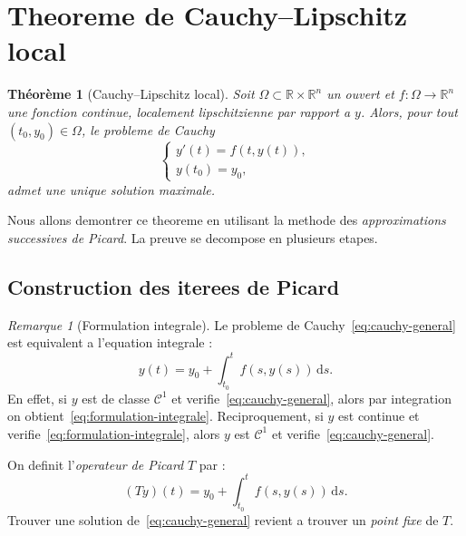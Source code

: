 \documentclass[12pt,a4paper,openany]{book}
\theoremstyle{definition}
\theoremstyle{plain}
\newtheorem{theoreme}[definition]{Théorème}
\theoremstyle{remark}
\newtheorem{remarque}[definition]{Remarque}
\newcommand{\R}{\mathbb{R}}
\newcommand{\dd}{\mathrm{d}}
\begin{document}
\section{Theoreme de Cauchy--Lipschitz local}\label{sec:cauchy-lipschitz}

\begin{theoreme}[Cauchy--Lipschitz local]\label{thm:cauchy-lipschitz}
Soit $\Omega \subset \R \times \R^n$ un ouvert et $f : \Omega \to \R^n$ une fonction continue, localement lipschitzienne par rapport a $y$. Alors, pour tout $(t_0, y_0) \in \Omega$, le probleme de Cauchy
\[
\begin{cases}
y'(t) = f(t, y(t)), \\
y(t_0) = y_0,
\end{cases}
\]
admet une \emph{unique} solution maximale.
\end{theoreme}

Nous allons demontrer ce theoreme en utilisant la methode des \emph{approximations successives de Picard}. La preuve se decompose en plusieurs etapes.

\subsection{Construction des iterees de Picard}\label{subsec:picard-construction}

\begin{remarque}[Formulation integrale]\label{rem:formulation-integrale}
Le probleme de Cauchy~\eqref{eq:cauchy-general} est equivalent a l'equation integrale :
\begin{equation}\label{eq:formulation-integrale}
y(t) = y_0 + \int_{t_0}^{t} f(s, y(s))\, \dd s.
\end{equation}
En effet, si $y$ est de classe $\mathcal{C}^1$ et verifie~\eqref{eq:cauchy-general}, alors par integration on obtient~\eqref{eq:formulation-integrale}. Reciproquement, si $y$ est continue et verifie~\eqref{eq:formulation-integrale}, alors $y$ est $\mathcal{C}^1$ et verifie~\eqref{eq:cauchy-general}.
\end{remarque}

On definit l'\emph{operateur de Picard} $T$ par :
\begin{equation}\label{eq:operateur-picard}
(Ty)(t) = y_0 + \int_{t_0}^{t} f(s, y(s))\, \dd s.
\end{equation}
Trouver une solution de~\eqref{eq:cauchy-general} revient a trouver un \emph{point fixe} de $T$.
\end{document}
